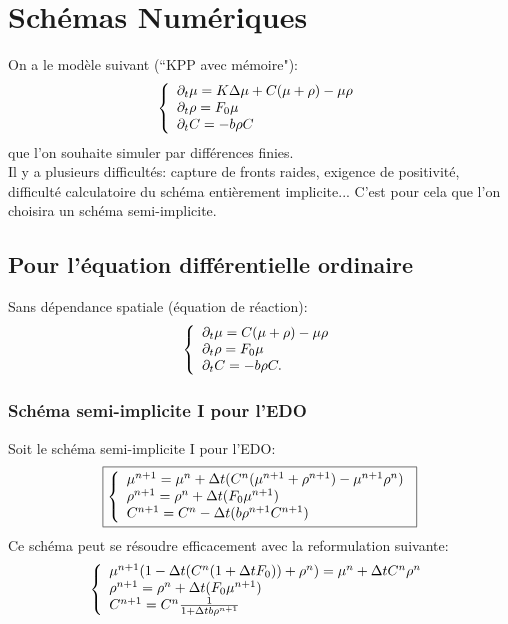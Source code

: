 \documentclass[11pt]{article}
\begin{document}
\fi

\section{Schémas Numériques}
On a le modèle suivant (``KPP avec mémoire"): 
\begin{equation} \left\{
                \begin{array}{ll}
                   \partial_t\mu = K\Delta\mu + C(\mu + \rho) -\mu\rho\\
                 \partial_t\rho=  F_0 \mu \\
                  \partial_t C = -b\rho C
                \end{array}
              \right.
\end{equation}
que l'on souhaite simuler par différences finies. \\
Il y a plusieurs difficultés: capture de fronts raides, exigence de positivité, difficulté calculatoire du schéma entièrement implicite... C'est pour cela que l'on choisira un schéma semi-implicite.
\subsection{Pour l'équation différentielle ordinaire}
Sans dépendance spatiale (équation de réaction):
\begin{equation} \left\{
                \begin{array}{ll}
                   \partial_t\mu = C(\mu + \rho) -\mu\rho\\
                 \partial_t\rho=  F_0 \mu \\
                  \partial_t C = -b\rho C.
                \end{array}
              \right.
\end{equation} 
\subsubsection{Schéma semi-implicite I pour l'EDO}
Soit le schéma semi-implicite I pour l'EDO:
\begin{equation} \boxed{\left\{
                \begin{array}{ll}
                   \mu^{n+1} = \mu^{n}+  \Delta t( C^{n}(\mu^{n+1} + \rho^{n+1}) -\mu^{n+1}\rho^{n})\\
                \rho^{n+1}=  \rho^{n}+ \Delta t (F_0 \mu^{n+1}) \\
                 C^{n+1} =C^{n}- \Delta t(b\rho^{n+1}C^{n+1})
                \end{array}
              \right.}
\end{equation}
Ce schéma peut se résoudre efficacement avec la reformulation suivante:
\begin{equation*} \left\{
                \begin{array}{ll}
                   \mu^{n+1}(1-\Delta t(C^{n}(1+\Delta t F_0)) + \rho^{n}) = \mu^{n}+  \Delta t C^{n}\rho^{n} \\
                \rho^{n+1}=  \rho^{n}+ \Delta t (F_0 \mu^{n+1}) \\
                 C^{n+1} =C^{n}\frac{1}{1+ \Delta t b\rho^{n+1}}
                \end{array}
              \right.
\end{equation*}
\end{document}
